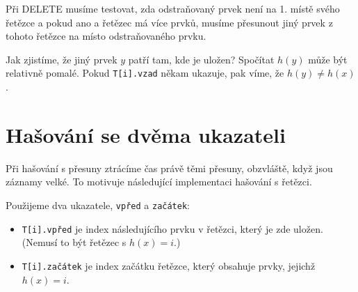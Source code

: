 Při DELETE musíme testovat, zda odstraňovaný prvek není na 1. místě
svého řetězce
a pokud ano a řetězec má více prvků, musíme přesunout jiný prvek z
tohoto řetězce na místo odstraňovaného prvku.

Jak zjistíme, že jiný prvek $y$ patří tam, kde je uložen? 
Spočítat $h(y)$
může být relativně pomalé. Pokud {\tt T[i].vzad} někam ukazuje, pak
víme, že $h(y) \ne h(x)$.


\section{Hašování se dvěma ukazateli}

Při hašování s přesuny ztrácíme čas právě těmi přesuny, obzvláště,
když jsou záznamy velké. To motivuje následující implementaci 
hašování s řetězci.

Použijeme dva ukazatele, {\tt vpřed} a {\tt začátek}:
\begin{itemize}
  \item {\tt T[i].vpřed} je index následujícího prvku v řetězci, 
  	který je zde uložen. (Nemusí to být řetězec s $h(x)=i$.)
  \item {\tt T[i].začátek} je index začátku řetězce, který obsahuje
  	prvky, jejichž $h(x)=i$.
\end{itemize}

